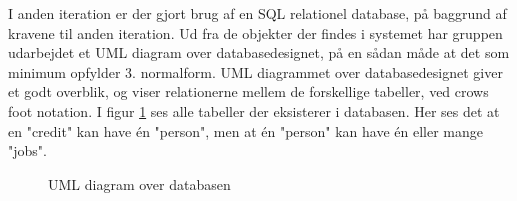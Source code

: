 I anden iteration er der gjort brug af en SQL relationel database, på baggrund af kravene til anden iteration. Ud fra de objekter der findes i systemet har gruppen udarbejdet et UML diagram over databasedesignet, på en sådan måde at det som minimum opfylder 3. normalform. 
UML diagrammet over databasedesignet giver et godt overblik, og viser relationerne mellem de forskellige tabeller, ved crows foot notation. I figur \ref{fig:databaseUML} ses alle tabeller der eksisterer i databasen. Her ses det at en "credit" kan have én "person", men at én "person" kan have én eller mange "jobs". 
\begin{figure}[H]
    \centering
    \caption{UML diagram over databasen}
    \label{fig:databaseUML}
\end{figure}